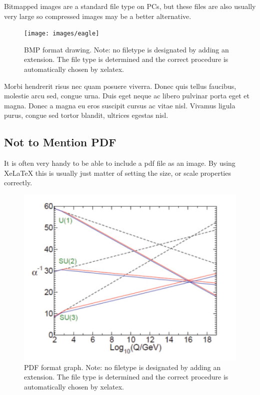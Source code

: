 Bitmapped images are a standard file type on PCs, but these files are also usually very large so compressed images may be a better alternative.

\begin{figure}[htbp]
  \centering
    \texttt{[image: images/eagle]}
    \caption[BMP format drawing. Note: no filetype is designated by adding an extension.]{BMP format drawing. Note: no filetype is designated by adding an extension. The file type is determined and the correct procedure is automatically chosen by xelatex.}
\end{figure}

Morbi hendrerit risus nec quam posuere viverra. Donec quis tellus faucibus, molestie arcu sed, congue urna. Duis eget neque ac libero pulvinar porta eget et magna. Donec a magna eu eros suscipit cursus ac vitae nisl. Vivamus ligula purus, congue sed tortor blandit, ultrices egestas nisl.

\subsection{Not to Mention PDF}

It is often very handy to be able to include a pdf file as an image. By using XeLaTeX this is usually just matter of setting the size, or scale properties correctly.

\begin{figure}[htbp]
  \centering
    \includegraphics[scale=1.0]{images/graph.pdf}
    \caption[PDF format graph. Note: no filetype is designated by adding an extension.]{PDF format graph. Note: no filetype is designated by adding an extension. The file type is determined and the correct procedure is automatically chosen by xelatex.}
\end{figure}


